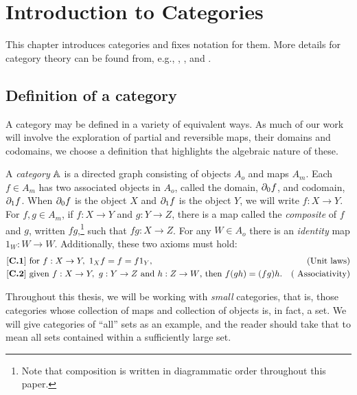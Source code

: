 
\chapter{Introduction to Categories}\label{chap:introduction_to_categories}

This chapter introduces categories and fixes notation for them. More
details for category theory can be found from, e.g., \cite{maclan97:categorieswrkmath}, \cite{cockett2009:ctcs},
\cite{barr:ctcs} and \cite{various:nlab}.

\section{Definition of a category}
\label{sec:definition_of_a_category}


A category may be defined in a variety of equivalent ways. As much of our
work will involve the exploration of partial and reversible maps, their domains and codomains, we
choose a definition that highlights the algebraic nature of these.

\begin{definition}\label{def:category}
  A \emph{category} $\mathbb{A}$ is a directed graph consisting of objects $A_o$ and maps $A_m$. Each $f\in
  A_m$ has two associated objects in $A_o$, called the domain, $\partial_0 f$, and codomain,
  $\partial_1 f$. When $\partial_0 f$ is the object $X$  and $\partial_1 f$ is the object $Y$, we
  will write $f:X \to Y$. For $f, g \in A_m$, if $f:X\to Y$ and $g:Y \to Z$, there is a map called
  the \emph{composite} of $f$ and $g$, written $f g$,\footnote{Note that composition is written in
    diagrammatic order throughout this paper.} such that $f g:X \to Z$. For any $W \in A_o$ there is
  an \emph{identity} map $1_W:W \to W$. Additionally, these two axioms must hold:
  \begin{align*}
    \catone &\text{ for }f:X \to Y,\ 1_X f = f = f 1_Y,&\text{(Unit laws)}\\
    \cattwo &\text{ given }f:X \to Y,\ g:Y \to Z\text{ and }h: Z\to W\text{, then }f (g h) = (f g) h.&\text{( Associativity)}
  \end{align*}
\end{definition}

Throughout   this thesis, we will be working with \emph{small} categories, that is, those categories
whose collection of maps and collection of objects is, in fact, a set. We will give categories of
``all'' sets as an example, and the reader should take that to mean all sets contained within a
sufficiently large set.

